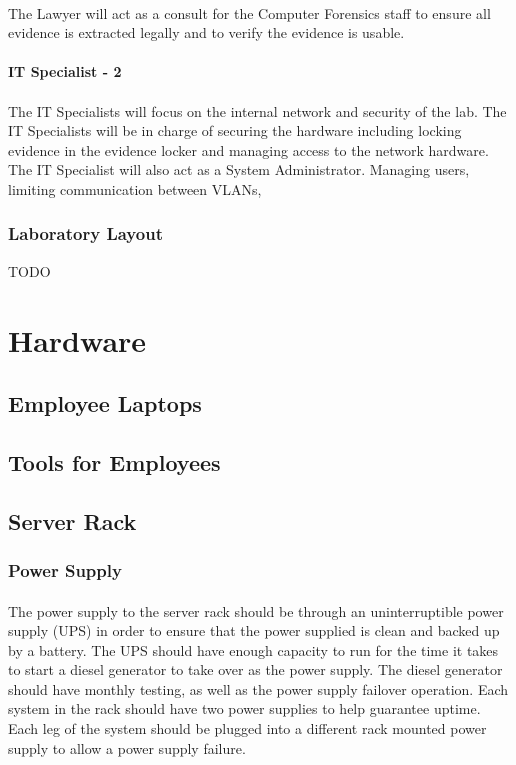 \documentclass{article}
\begin{document}
\paragraph{} The Lawyer will act as a consult for the Computer Forensics staff to ensure all evidence is extracted legally and to verify the evidence is usable.

\paragraph{IT Specialist - 2}
\paragraph{} The IT Specialists will focus on the internal network and security of the lab.  The IT Specialists will be in charge of securing the hardware including locking evidence in the evidence locker and managing access to the network hardware. The IT Specialist will also act as a System Administrator.  Managing users, limiting communication between VLANs,
\subsubsection{Laboratory Layout}
TODO


\section{Hardware}
\subsection{Employee Laptops} 
\subsection{Tools for Employees} 
\subsection{Server Rack}
\subsubsection{Power Supply} \paragraph{} The power supply to the server rack should be through an uninterruptible power supply (UPS) in order to ensure that the power supplied is clean and backed up by a battery. The UPS should have enough capacity to run for the time it takes to start a diesel generator to take over as the power supply. The diesel generator should have monthly testing, as well as the power supply failover operation. Each system in the rack should have two power supplies to help guarantee uptime. Each leg of the system should be plugged into a different rack mounted power supply to allow a power supply failure. 
\end{document}
